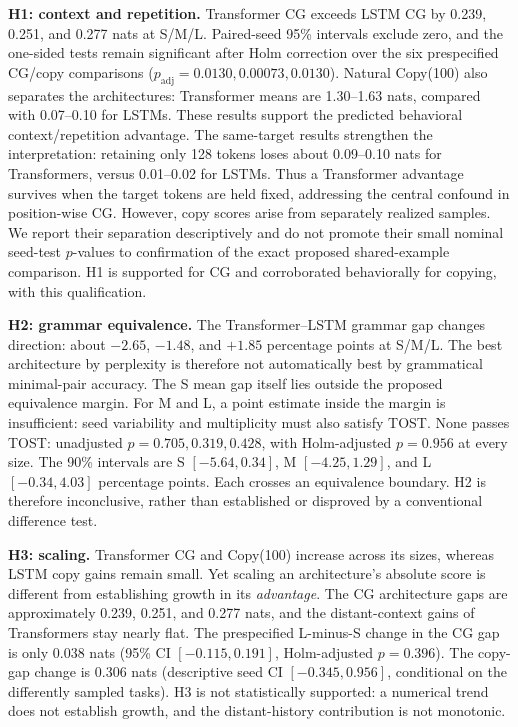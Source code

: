 \documentclass[10pt]{article}
\begin{document}
\textbf{H1: context and repetition.} Transformer CG exceeds LSTM CG by 0.239, 0.251, and 0.277 nats at S/M/L. Paired-seed 95\% intervals exclude zero, and the one-sided tests remain significant after Holm correction over the six prespecified CG/copy comparisons ($p_{\mathrm{adj}}=0.0130,0.00073,0.0130$). Natural Copy(100) also separates the architectures: Transformer means are 1.30--1.63 nats, compared with 0.07--0.10 for LSTMs. These results support the predicted behavioral context/repetition advantage. The same-target results strengthen the interpretation: retaining only 128 tokens loses about 0.09--0.10 nats for Transformers, versus 0.01--0.02 for LSTMs. Thus a Transformer advantage survives when the target tokens are held fixed, addressing the central confound in position-wise CG. However, copy scores arise from separately realized samples. We report their separation descriptively and do not promote their small nominal seed-test $p$-values to confirmation of the exact proposed shared-example comparison. H1 is supported for CG and corroborated behaviorally for copying, with this qualification.

\textbf{H2: grammar equivalence.} The Transformer--LSTM grammar gap changes direction: about $-2.65$, $-1.48$, and $+1.85$ percentage points at S/M/L. The best architecture by perplexity is therefore not automatically best by grammatical minimal-pair accuracy. The S mean gap itself lies outside the proposed equivalence margin. For M and L, a point estimate inside the margin is insufficient: seed variability and multiplicity must also satisfy TOST. None passes TOST: unadjusted $p=0.705,0.319,0.428$, with Holm-adjusted $p=0.956$ at every size. The 90\% intervals are S $[-5.64,0.34]$, M $[-4.25,1.29]$, and L $[-0.34,4.03]$ percentage points. Each crosses an equivalence boundary. H2 is therefore inconclusive, rather than established or disproved by a conventional difference test.

\textbf{H3: scaling.} Transformer CG and Copy(100) increase across its sizes, whereas LSTM copy gains remain small. Yet scaling an architecture's absolute score is different from establishing growth in its \emph{advantage}. The CG architecture gaps are approximately 0.239, 0.251, and 0.277 nats, and the distant-context gains of Transformers stay nearly flat. The prespecified L-minus-S change in the CG gap is only 0.038 nats (95\% CI $[-0.115,0.191]$, Holm-adjusted $p=0.396$). The copy-gap change is 0.306 nats (descriptive seed CI $[-0.345,0.956]$, conditional on the differently sampled tasks). H3 is not statistically supported: a numerical trend does not establish growth, and the distant-history contribution is not monotonic.
\end{document}
